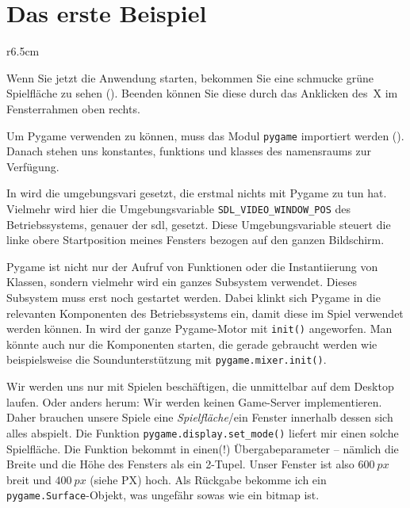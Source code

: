 \section{Das erste Beispiel}


\begin{wrapfigure}[11]{r}{6.5cm}
    \vspace{-1em}
\end{wrapfigure}
Wenn Sie jetzt die Anwendung starten, bekommen Sie eine schmucke grüne Spielfläche zu sehen (). Beenden können Sie diese durch das Anklicken des~X im Fensterrahmen oben rechts.


Um Pygame verwenden zu können, muss das Modul \texttt{pygame} importiert werden (). Danach stehen uns \glspl{konstante}, \glspl{funktion} und \glspl{klasse} des \Gls{namensraum}s zur Verfügung. 

In   wird die \Gls{umgebungsvari} gesetzt, die erstmal nichts mit Pygame zu tun hat. Vielmehr wird hier die Umgebungsvariable \texttt{SDL\_VIDEO\_WINDOW\_POS} des Betriebssystems, genauer der \Gls{sdl}, gesetzt. Diese Umgebungsvariable steuert die linke obere Startposition meines Fensters bezogen auf den ganzen Bildschirm. 

Pygame ist nicht nur der Aufruf von Funktionen oder die Instantiierung von Klassen, sondern vielmehr wird ein ganzes Subsystem verwendet. Dieses Subsystem muss erst noch gestartet werden. Dabei klinkt sich Pygame in die relevanten Komponenten des Betriebssystems ein, damit diese im Spiel verwendet werden können. In  wird der ganze Pygame-Motor mit \texttt{init()} angeworfen. Man könnte auch nur die Komponenten starten, die gerade gebraucht werden wie beispielsweise die Soundunterstützung mit \texttt{pygame.mixer.init()}.

Wir werden uns nur mit Spielen beschäftigen, die unmittelbar auf dem Desktop laufen. Oder anders herum: Wir werden keinen Game-Server implementieren. Daher brauchen unsere Spiele eine \emph{Spielfläche}/ein Fenster innerhalb dessen sich alles abspielt. Die Funktion \texttt{pygame.display.set\_mode()} liefert mir einen solche Spielfläche. Die Funktion bekommt in  einen(!) Übergabeparameter -- nämlich die Breite und die Höhe des Fensters als ein 2-Tupel. Unser Fenster ist also $600~px$ breit und $400~px$ (siehe \Gls{PX}) hoch. Als Rückgabe bekomme ich ein \texttt{pygame.Surface}-Objekt, was ungefähr sowas wie ein \Gls{bitmap} ist. 

